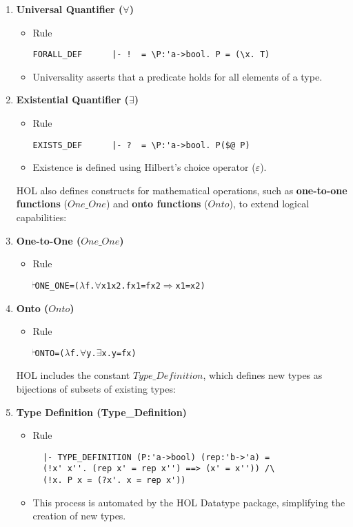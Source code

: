 \begin{enumerate}
    \item \textbf{Universal Quantifier ($\forall$)}
    \begin{itemize}
        \item Rule
\begin{verbatim}
FORALL_DEF      |- !  = \P:'a->bool. P = (\x. T)
\end{verbatim}
        \item Universality asserts that a predicate holds for all elements of a type.
    \end{itemize}

    \item \textbf{Existential Quantifier ($\exists$)}
    \begin{itemize}
        \item Rule
\begin{verbatim}
EXISTS_DEF      |- ?  = \P:'a->bool. P($@ P)
\end{verbatim}
        \item Existence is defined using Hilbert’s choice operator ($\varepsilon$).
    \end{itemize}

HOL also defines constructs for mathematical operations, such as \textbf{one-to-one functions} ($One\_One$) and \textbf{onto functions} ($Onto$), to extend logical capabilities:

    \item \textbf{One-to-One ($One\_One$)}
    \begin{itemize}
        \item Rule
          \begin{alltt}
            \(\!\!\!{\turn}\!\!\!\!\) ONE_ONE = (\(\lambda\)f. \(\forall\)x1 x2. f x1 = f x2 \(\Rightarrow\) x1 = x2)
          \end{alltt}
    \end{itemize}

    \item \textbf{Onto ($Onto$)}
    \begin{itemize}
        \item Rule
          \begin{alltt}
            \(\!\!\!{\turn}\!\!\!\!\) ONTO = (\(\lambda\)f. \(\forall\)y. \(\exists\)x. y = f x)
          \end{alltt}
    \end{itemize}

HOL includes the constant $Type\_Definition$, which defines new types as bijections of subsets of existing types:
    \item \textbf{Type Definition (Type\_Definition)}
    \begin{itemize}
        \item Rule
          \begin{hol}
\begin{verbatim}
  |- TYPE_DEFINITION (P:'a->bool) (rep:'b->'a) =
  (!x' x''. (rep x' = rep x'') ==> (x' = x'')) /\
  (!x. P x = (?x'. x = rep x'))
\end{verbatim}
          \end{hol}
        \item This process is automated by the HOL Datatype package, simplifying the creation of new types.


\end{itemize}
\end{enumerate}
